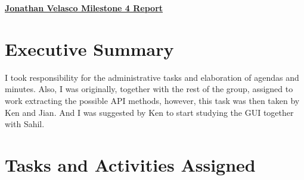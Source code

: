 \begin{center}
{\textbf{\underline{{Jonathan Velasco Milestone 4 Report}}}}
\end{center}

\section*{Executive Summary}

I took responsibility for the administrative tasks and elaboration of agendas and minutes.  Also, I was originally, together with the rest of the group, assigned to work extracting the possible API methods, however, this task was then taken by Ken and Jian.  And I was suggested by Ken to start studying the GUI together with Sahil.

\section*{Tasks and Activities Assigned}

